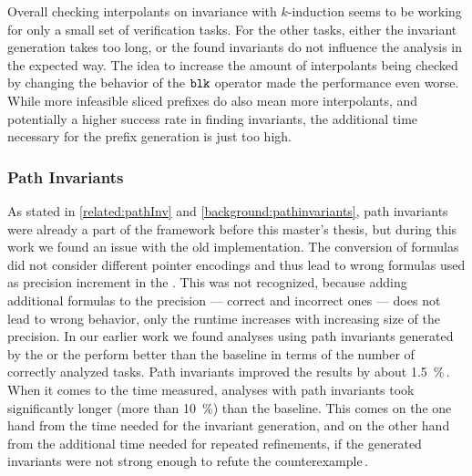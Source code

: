 Overall checking interpolants on invariance with $k$-induction seems to be working for only a small set of verification tasks. For the other tasks, either the invariant generation takes too long, or the
found invariants do not influence the analysis in the expected way. The idea to increase the amount of interpolants being checked by changing the behavior of the $\mathtt{blk}$ operator made the performance even worse.
While more infeasible sliced prefixes do also mean more interpolants, and potentially a higher success rate in finding invariants, the additional time necessary for the prefix generation is just too high.

\subsubsection*{Path Invariants}

As stated in \autoref{related:pathInv} and \autoref{background:pathinvariants}, path invariants were already a part of the \CPAchecker{} framework before this master's thesis, but during this work we
found an issue with the old implementation. The conversion of formulas did not consider different pointer encodings and thus lead to wrong formulas used as precision increment in the \PredicateCPA{}.
This was not recognized, because adding additional formulas to the precision --- correct and incorrect ones --- does not lead to wrong behavior, only the runtime increases with increasing size of the
precision. In our earlier work we found analyses using path invariants generated by the \InvariantsCPA{} or the \PolicyCPA{} perform better than the baseline in terms of the number of correctly
analyzed tasks. Path invariants improved the results by about \SI{1.5}{\percent}\,. When it comes to the time measured, analyses with path invariants took significantly longer (more than \SI{10}{\percent}) than the baseline.
This comes on the one hand from the time needed for the invariant generation, and on the other hand from the additional time needed for repeated refinements, if the generated invariants were not
strong enough to refute the counterexample\,.

